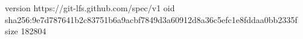version https://git-lfs.github.com/spec/v1
oid sha256:9e7d787641b2c83751b6a9acbf7849d3a60912d8a36c5efc1e8fddaa0bb2335f
size 182804
